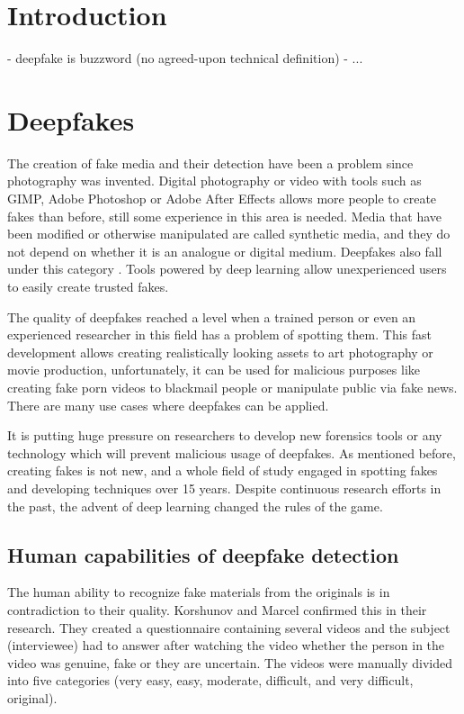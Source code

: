\chapter{Introduction}

- deepfake is buzzword (no agreed-upon technical definition)
- ...

\chapter{Deepfakes}

The creation of fake media and their detection have been a problem since photography was invented. Digital photography or video with tools such as GIMP, Adobe Photoshop or Adobe After Effects allows more people to create fakes than before, still some experience in this area is needed. Media that have been modified or otherwise manipulated are called synthetic media, and they do not depend on whether it is an analogue or digital medium. Deepfakes also fall under this category \cite{IncreasingThreatofDeepfakeIdentites}. Tools powered by deep learning allow unexperienced users to easily create trusted fakes. 

The quality of deepfakes reached a level when a trained person or even an experienced researcher in this field has a problem of spotting them. This fast development allows creating realistically looking assets to art photography or movie production, unfortunately, it can be used for malicious purposes like creating fake porn videos to blackmail people or manipulate public via fake news. There are many use cases where deepfakes can be applied.

It is putting huge pressure on researchers to develop new forensics tools or any technology which will prevent malicious usage of deepfakes. As mentioned before, creating fakes is not new, and a whole field of study engaged in spotting fakes and developing techniques over 15 years. Despite continuous research efforts in the past, the advent of deep learning changed the rules of the game. \cite{MediaForensicsandDeepFakes}

\section{Human capabilities of deepfake detection}

The human ability to recognize fake materials from the originals is in contradiction to their quality. Korshunov and Marcel confirmed this in their research. They created a questionnaire containing several videos and the subject (interviewee) had to answer after watching the video whether the person in the video was genuine, fake or they are uncertain. The videos were manually divided into five categories (very easy, easy, moderate, difficult, and very difficult, original). 

